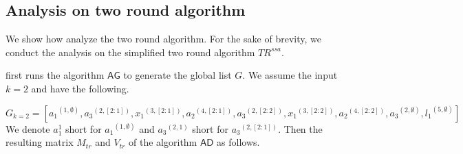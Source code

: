 \subsection{Analysis on two round algorithm}
We show how {\THESYSTEM} analyze the two round algorithm. For the sake of brevity, we conduct the analysis on the simplified two round algorithm $TR^{ssa}$.

{\THESYSTEM} first runs the algorithm $\mathsf{AG}$ to generate the global list $G$. We assume the input $k=2$ and have the following.

\[G_{k=2} = \left[
  {a_1}^{(1,\emptyset)} , {a_3}^{(2,[2:1])} , {x_1}^{(3,[2:1])} , {a_2}^{(4,[2:1])} ,  {a_3}^{(2,[2:2])} , {x_1}^{(3,[2:2])} , {a_2}^{(4,[2:2])} , {a_3}^{(2,\emptyset)} , {l_1}^{(5,\emptyset)}   \right] \]
 We denote $a_1^{1}$ short for ${a_1}^{(1,\emptyset)}$ and ${a_3}^{(2,1)}$ short for ${a_3}^{(2,[2:1])}$. Then the resulting matrix $M_{tr}$ and $V_{tr}$ of the algorithm $\mathsf{AD}$ as follows.
 
